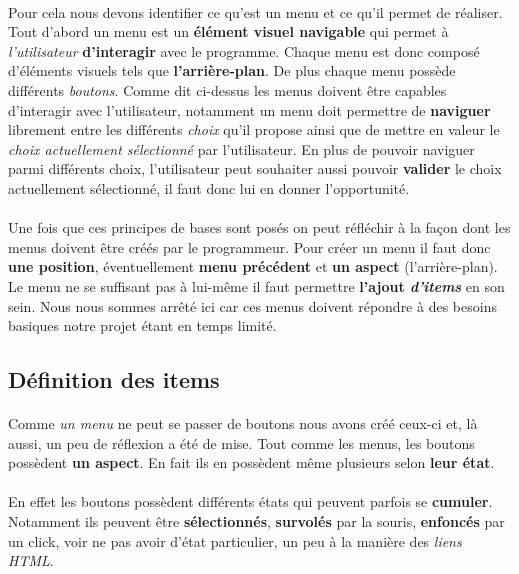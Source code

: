 	        \paragraph{}Pour cela nous devons identifier ce qu’est un menu et ce qu’il permet de réaliser. Tout d’abord un menu est un \textbf{élément visuel navigable} qui permet à \textit{l’utilisateur} \textbf{d’interagir} avec le programme. Chaque menu est donc composé d’éléments visuels tels que \textbf{l’arrière-plan}. De plus chaque menu possède différents \textit{boutons}. Comme dit ci-dessus les menus doivent être capables d’interagir avec l’utilisateur, notamment un menu doit permettre de \textbf{naviguer} librement entre les différents \textit{choix} qu’il propose ainsi que de mettre en valeur le \textit{choix actuellement sélectionné} par l’utilisateur. En plus de pouvoir naviguer parmi différents choix, l’utilisateur peut souhaiter aussi pouvoir \textbf{valider} le choix actuellement sélectionné, il faut donc lui en donner l’opportunité. 
	        
            \paragraph{}Une fois que ces principes de bases sont posés on peut réfléchir à la façon dont les menus doivent être créés par le programmeur. Pour créer un menu il faut donc \textbf{une position}, éventuellement \textbf{ menu précédent} et \textbf{un aspect} (l’arrière-plan). Le menu ne se suffisant pas à lui-même il faut permettre \textbf{l’ajout \textit{d’items}} en son sein. Nous nous sommes arrêté ici car ces menus doivent répondre à des besoins basiques notre projet étant en temps limité.
             
        \subsection{Définition des items}
            \paragraph{}Comme \textit{un menu} ne peut se passer de boutons nous avons créé ceux-ci et, là aussi, un peu de réflexion a été de mise. Tout comme les menus, les boutons possèdent \textbf{un aspect}. En fait ils en possèdent même plusieurs selon \textbf{leur état}.
            \paragraph{}En effet les boutons possèdent différents états qui peuvent parfois se \textbf{cumuler}. Notamment ils peuvent être \textbf{sélectionnés}, \textbf{survolés} par la souris, \textbf{enfoncés} par un click, voir ne pas avoir d’état particulier, un peu à la manière des \textit{liens HTML}.
            
